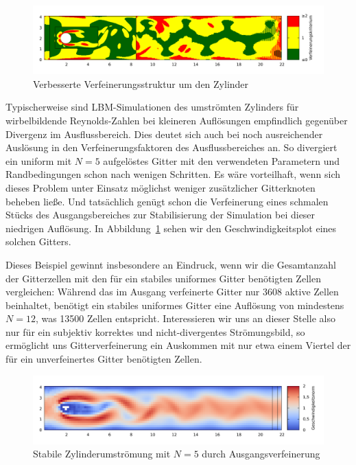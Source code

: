 \begin{figure}[h]
\begin{adjustbox}{center}
\includegraphics[width=1.2\textwidth]{img/static/cylinder2d_improved_grid_n20_re100_16s_knudsen.pdf}
\end{adjustbox}
\caption{Verbesserte Verfeinerungsstruktur um den Zylinder}
\end{figure}

Typischerweise sind LBM-Simulationen des umströmten Zylinders für wirbelbildende Reynolds-Zahlen bei kleineren Auflösungen empfindlich gegenüber Divergenz im Ausflussbereich. Dies deutet sich auch bei noch ausreichender Auslösung in den Verfeinerungsfaktoren des Ausflussbereiches an. So divergiert ein uniform mit \(N=5\) aufgelöstes Gitter mit den verwendeten Parametern und Randbedingungen schon nach wenigen Schritten.
Es wäre vorteilhaft, wenn sich dieses Problem unter Einsatz möglichst weniger zusätzlicher Gitterknoten beheben ließe. Und tatsächlich genügt schon die Verfeinerung eines schmalen Stücks des Ausgangsbereiches zur Stabilisierung der Simulation bei dieser niedrigen Auflösung. In Abbildung~\ref{fig:CylinderOptimizedGridN5} sehen wir den Geschwindigkeitsplot eines solchen Gitters.

\bigskip

Dieses Beispiel gewinnt insbesondere an Eindruck, wenn wir die Gesamtanzahl der Gitterzellen mit den für ein stabiles uniformes Gitter benötigten Zellen vergleichen: Während das im Ausgang verfeinerte Gitter nur 3608 aktive Zellen beinhaltet, benötigt ein stabiles uniformes Gitter eine Auflösung von mindestens \(N=12\), was 13500 Zellen entspricht. Interessieren wir uns an dieser Stelle also nur für ein subjektiv korrektes und nicht-divergentes Strömungsbild, so ermöglicht uns Gitterverfeinerung ein Auskommen mit nur etwa einem Viertel der für ein unverfeinertes Gitter benötigten Zellen.

\begin{figure}[h]
\begin{adjustbox}{center}
\includegraphics[width=1.2\textwidth]{img/static/cylinder2d_low_resolution_outflow_refine_n5_re100_16s.pdf}
\end{adjustbox}
\caption{Stabile Zylinderumströmung mit \(N=5\) durch Ausgangsverfeinerung}
\label{fig:CylinderOptimizedGridN5}
\end{figure}

